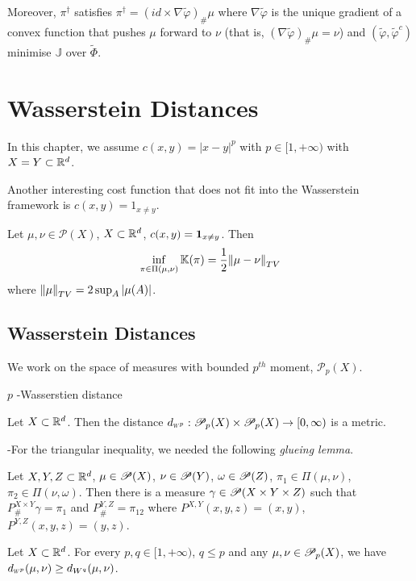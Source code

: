 \documentclass[10pt,a4paper]{article}
\begin{document}
\quad Moreover, $\pi^{\dagger}$ satisfies $\pi^{\dagger} = (id \times \nabla \tilde{\varphi})_{\#} \mu$ where $\nabla \tilde{\varphi}$ is the unique gradient of a convex function that pushes $\mu$ forward to $\nu$ (that is, $(\nabla \tilde{\varphi})_{\#} \mu = \nu$) and $(\tilde{\varphi},\tilde{\varphi}^c)$ minimise $\mathbb{J}$ over $\tilde{\Phi}$.
\s


\section{Wasserstein Distances}

In this chapter, we assume $c(x,y)  = |x-y|^p$ with $p\in [1, +\infty)$ with $X=Y \subset \mathbb{R}^d$.
\s

Another interesting cost function that does not fit into the Wasserstein framework is $c(x,y) = 1_{x\neq y}$.
\s

 Let $\mu, \nu \in \mathscr{P}(X)$, $X\subset \mathbb{R}^d$, $c(x,y) =\bm{1}_{x\neq y}$. Then
\begin{align*}
\inf_{\pi \in \Pi(\mu, \nu)} \mathbb{K}(\pi) = \frac{1}{2} \snorms{\mu - \nu}{TV}
\end{align*}
where $\snorms{\mu}{TV} = 2\sup_A |\mu(A)|$.

\subsection{Wasserstein Distances}

We work on the space of measures with bounded $p^{th}$ moment, $\mathscr{P}_p(X)$.
\s

 $p$ -Wasserstien distance\s

 Let $X\subset \mathbb{R}^d$. Then the distance $\wa{p} : \PP_p(X) \times \PP_p(X) \rightarrow [0, \infty)$ is a metric.
\s

-For the triangular inequality, we needed the following \emph{glueing lemma}.
\s

 Let $X, Y, Z \subset \mathbb{R}^d$, $\mu\in \mathscr{P}(X)$, $\nu \in \mathscr{P}(Y)$, $\omega \in \mathscr{P}(Z)$, $\pi_1\in \Pi(\mu, \nu)$, $\pi_2 \in \Pi(\nu, \omega)$. Then there is a measure $\gamma \in \mathscr{P} (X\times Y \times Z)$ such that $P_{\#}^{X\times Y} \gamma = \pi_1$ and $P_{\#}^{Y,Z} = \pi_{12}$ where $P^{X,Y}(x,y,z) = (x,y)$, $P^{Y,Z}(x,y,z) =(y,z)$.
\s

 Let $X\subset \mathbb{R}^d$. For every $p,q \in [1, +\infty)$, $q\leq p$ and any $\mu, \nu\in \mathscr{P}_p(X)$, we have $\wa{p}(\mu, \nu) \geq d_{W^q} (\mu, \nu)$.
\end{document}
